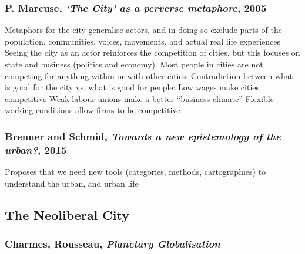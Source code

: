 \documentclass{article}
\begin{document}
\subsubsection{P. Marcuse, \textit{`The City' as a perverse metaphore}, 2005}

\begin{outline}
	\1 Metaphors for the city generalise actors, and in doing so exclude parts of the population, communities, voices, movements, and actual real life experiences
	\1 Seeing the city as an actor reinforces the competition of cities, but this focuses on state and business (politics and economy). Most people in cities are not competing for anything within or with other cities. 
	\1 Contradiction between what is good for the city vs. what is good for people:
		\2 Low wages make cities competitive
		\2 Weak labour unions make a better ``business climate''
		\2 Flexible working conditions allow firms to be competitive
\end{outline}

\subsubsection{Brenner and Schmid, \textit{Towards a new epistemology of the urban?}, 2015}

\begin{outline}
	\1 Proposes that we need new tools (categories, methods, cartographies) to understand the urban, and urban life
\end{outline}

\subsection{The Neoliberal City}

\subsubsection{Charmes, Rousseau, \textit{Planetary Globalisation}}
\end{document}
